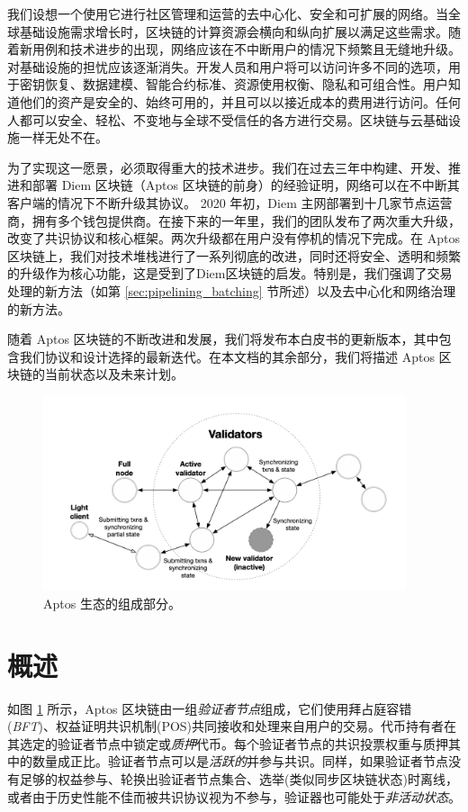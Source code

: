 \documentclass{article}
\begin{document}
我们设想⼀个使⽤它进行社区管理和运营的去中⼼化、安全和可扩展的⽹络。当全球基础设施需求增长时，区块链的计算资源会横向和纵向扩展以满⾜这些需求。随着新⽤例和技术进步的出现，⽹络应该在不中断⽤户的情况下频繁且⽆缝地升级。对基础设施的担忧应该逐渐消失。开发⼈员和⽤户将可以访问许多不同的选项，⽤于密钥恢复、数据建模、智能合约标准、资源使⽤权衡、隐私和可组合性。⽤户知道他们的资产是安全的、始终可⽤的，并且可以以接近成本的费⽤进行访问。任何⼈都可以安全、轻松、不变地与全球不受信任的各⽅进行交易。区块链与云基础设施⼀样⽆处不在。 

为了实现这⼀愿景，必须取得重⼤的技术进步。我们在过去三年中构建、开发、推进和部署 Diem 区块链（Aptos 区块链的前⾝）的经验证明，⽹络可以在不中断其客户端的情况下不断升级其协议\cite{diem_blockchain}。 2020 年初，Diem 主⽹部署到⼗几家节点运营商，拥有多个钱包提供商。在接下来的⼀年里，我们的团队发布了两次重⼤升级，改变了共识协议和核⼼框架。两次升级都在⽤户没有停机的情况下完成。在 Aptos 区块链上，我们对技术堆栈进行了⼀系列彻底的改进，同时还将安全、透明和频繁的升级作为核⼼功能，这是受到了Diem区块链的启发。特别是，我们强调了交易处理的新⽅法（如第 \ref{sec:pipelining_batching} 节所述）以及去中⼼化和⽹络治理的新⽅法。

随着 Aptos 区块链的不断改进和发展，我们将发布本⽩⽪书的更新版本，其中包含我们协议和设计选择的最新迭代。在本⽂档的其余部分，我们将描述 Aptos 区块链的当前状态以及未来计划。 

\begin{figure}
\centering
\includegraphics[width=0.95\textwidth]{validators.png}
\caption{\label{fig:aptos_ecosystem}Aptos 生态的组成部分。}
\end{figure}

\section{概述}

如图 \ref{fig:aptos_ecosystem} 所⽰，Aptos 区块链由⼀组\emph{验证者节点}组成，它们使⽤拜占庭容错 (\emph{BFT})、权益证明共识机制(POS)共同接收和处理来⾃⽤户的交易。代币持有者在其选定的验证者节点中锁定或\emph{质押}代币。每个验证者节点的共识投票权重与质押其中的数量成正⽐。验证者节点可以是\emph{活跃的}并参与共识。同样，如果验证者节点没有⾜够的权益参与、轮换出验证者节点集合、选举(类似同步区块链状态)时离线，或者由于历史性能不佳⽽被共识协议视为不参与，验证器也可能处于\emph{⾮活动状态}。 
\end{document}
